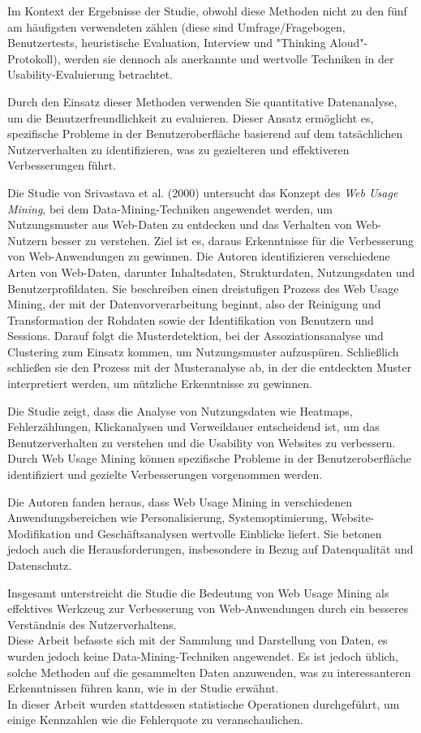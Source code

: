 \documentclass[12pt,oneside]{article}
\begin{document}
Im Kontext der Ergebnisse der Studie, obwohl diese Methoden nicht zu den fünf am häufigsten verwendeten zählen (diese sind Umfrage/Fragebogen, Benutzertests, heuristische Evaluation, Interview und "Thinking Aloud"-Protokoll), werden sie dennoch als anerkannte und wertvolle Techniken in der Usability-Evaluierung betrachtet.

Durch den Einsatz dieser Methoden verwenden Sie quantitative Datenanalyse, um die Benutzerfreundlichkeit zu evaluieren. Dieser Ansatz ermöglicht es, spezifische Probleme in der Benutzeroberfläche basierend auf dem tatsächlichen Nutzerverhalten zu identifizieren, was zu gezielteren und effektiveren Verbesserungen führt.

Die Studie von Srivastava et al. (2000)\cite{Srivastava2000} untersucht das Konzept des \textit{Web Usage Mining}, bei dem Data-Mining-Techniken angewendet werden, um Nutzungsmuster aus Web-Daten zu entdecken und das Verhalten von Web-Nutzern besser zu verstehen. Ziel ist es, daraus Erkenntnisse für die Verbesserung von Web-Anwendungen zu gewinnen. Die Autoren identifizieren verschiedene Arten von Web-Daten, darunter Inhaltsdaten, Strukturdaten, Nutzungsdaten und Benutzerprofildaten. Sie beschreiben einen dreistufigen Prozess des Web Usage Mining, der mit der Datenvorverarbeitung beginnt, also der Reinigung und Transformation der Rohdaten sowie der Identifikation von Benutzern und Sessions. Darauf folgt die Musterdetektion, bei der Assoziationsanalyse und Clustering zum Einsatz kommen, um Nutzungsmuster aufzuspüren. Schließlich schließen sie den Prozess mit der Musteranalyse ab, in der die entdeckten Muster interpretiert werden, um nützliche Erkenntnisse zu gewinnen.

Die Studie zeigt, dass die Analyse von Nutzungsdaten wie Heatmaps, Fehlerzählungen, Klickanalysen und Verweildauer entscheidend ist, um das Benutzerverhalten zu verstehen und die Usability von Websites zu verbessern. Durch Web Usage Mining können spezifische Probleme in der Benutzeroberfläche identifiziert und gezielte Verbesserungen vorgenommen werden.

Die Autoren fanden heraus, dass Web Usage Mining in verschiedenen Anwendungsbereichen wie Personalisierung, Systemoptimierung, Website-Modifikation und Geschäftsanalysen wertvolle Einblicke liefert. Sie betonen jedoch auch die Herausforderungen, insbesondere in Bezug auf Datenqualität und Datenschutz.

Insgesamt unterstreicht die Studie die Bedeutung von Web Usage Mining als effektives Werkzeug zur Verbesserung von Web-Anwendungen durch ein besseres Verständnis des Nutzerverhaltens.\\ 
Diese Arbeit befasste sich mit der Sammlung und Darstellung von Daten, es wurden jedoch keine Data-Mining-Techniken angewendet. Es ist jedoch üblich, solche Methoden auf die gesammelten Daten anzuwenden, was zu interessanteren Erkenntnissen führen kann, wie in der Studie erwähnt.\\
 In dieser Arbeit wurden stattdessen statistische Operationen durchgeführt, um einige Kennzahlen wie die Fehlerquote zu veranschaulichen.
\end{document}
